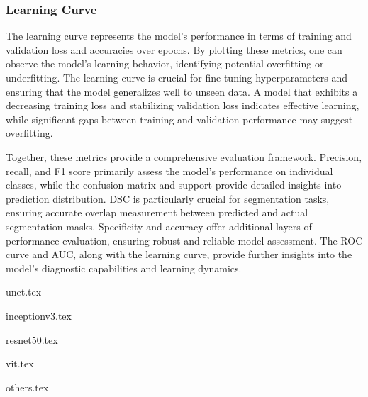\subsubsection{Learning Curve}

The learning curve represents the model's performance in terms of training and validation loss and accuracies over epochs. By plotting these metrics, one can observe the model's learning behavior, identifying potential overfitting or underfitting. The learning curve is crucial for fine-tuning hyperparameters and ensuring that the model generalizes well to unseen data. A model that exhibits a decreasing training loss and stabilizing validation loss indicates effective learning, while significant gaps between training and validation performance may suggest overfitting.

Together, these metrics provide a comprehensive evaluation framework. Precision, recall, and F1 score primarily assess the model's performance on individual classes, while the confusion matrix and support provide detailed insights into prediction distribution. DSC is particularly crucial for segmentation tasks, ensuring accurate overlap measurement between predicted and actual segmentation masks. Specificity and accuracy offer additional layers of performance evaluation, ensuring robust and reliable model assessment. The ROC curve and AUC, along with the learning curve, provide further insights into the model's diagnostic capabilities and learning dynamics.




{unet.tex}

{inceptionv3.tex}

{resnet50.tex}

{vit.tex}

{others.tex}
